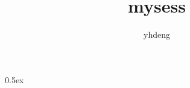 \documentclass[11pt,a4paper]{article}
\begin{document}
\title{mysess}
\author{yhdeng}
\maketitle

\tableofcontents

\parindent 0pt\parskip 0.5ex



%
%
\end{document}
